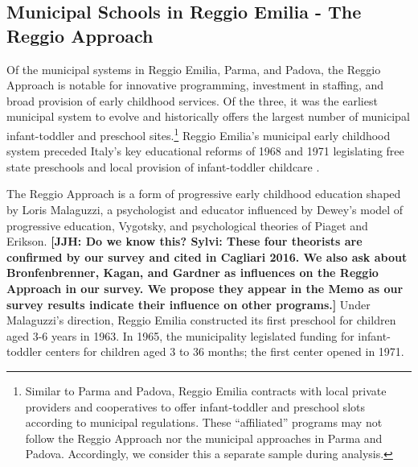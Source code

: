 
\subsection{Municipal Schools in Reggio Emilia - The Reggio Approach}

Of the municipal systems in Reggio Emilia, Parma, and Padova, the Reggio Approach is notable for innovative programming, investment in staffing, and broad provision of early childhood services. Of the three, it was the earliest municipal system to evolve and historically offers the largest number of municipal infant-toddler and preschool sites.\footnote{Similar to Parma and Padova, Reggio Emilia contracts with local private providers and cooperatives to offer infant-toddler and preschool slots according to municipal regulations. These ``affiliated'' programs may not follow the Reggio Approach nor the municipal approaches in Parma and Padova. Accordingly, we consider this a separate sample during analysis.} Reggio Emilia's municipal early childhood system preceded Italy's key educational reforms of 1968 and 1971 legislating free state preschools and local provision of infant-toddler childcare \citep{Cagliari-etal-eds_2016_BOOK_Loris-Malaguzzi}. 

The Reggio Approach is a form of progressive early childhood education shaped by Loris Malaguzzi, a psychologist and educator influenced by Dewey's model of progressive education, Vygotsky, and psychological theories of Piaget and Erikson. \textbf{[JJH: Do we know this? Sylvi: These four theorists are confirmed by our survey and cited in Cagliari 2016. We also ask about Bronfenbrenner, Kagan, and Gardner as influences on the Reggio Approach in our survey. We propose they appear in the Memo as our survey results indicate their influence on other programs.]} Under Malaguzzi's direction, Reggio Emilia constructed its first preschool for children aged 3-6 years in 1963. In 1965, the municipality legislated funding for infant-toddler centers for children aged 3 to 36 months; the first center opened in 1971. 

